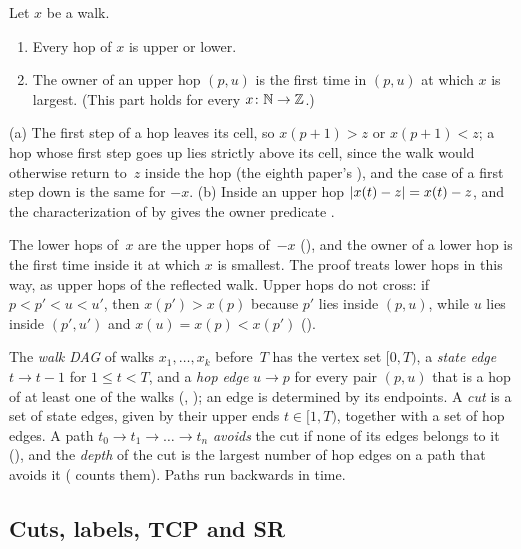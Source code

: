 \begin{lemma}\label{lem:hops}
Let $x$ be a walk.
\begin{enumerate}[label=(\alph*)]
\item Every hop of $x$ is upper or lower.
\item The owner of an upper hop $(p,u)$ is the first time in $(p,u)$ at which $x$ is largest. (This part holds for every
$x\colon\mathbb{N}\to\mathbb{Z}$.)
\end{enumerate}
\end{lemma}

\begin{outline}
(a) The first step of a hop leaves its cell, so $x(p+1)>z$ or $x(p+1)<z$; a hop whose first step goes up lies strictly above
its cell, since the walk would otherwise return to~$z$ inside the hop (the eighth paper's ),
and the case of a first step down is the same for $-x$. (b) Inside an upper hop $\lvert x(t)-z \rvert=x(t)-z$, and the
characterization of  by  gives the owner predicate
.
\end{outline}

The lower hops of~$x$ are the upper hops of~$-x$ (), and the owner of a lower hop is the
first time inside it at which $x$ is smallest. The proof treats lower hops in this way, as upper hops of the reflected walk.
Upper hops do not cross: if $p<p'<u<u'$, then $x(p')>x(p)$ because $p'$ lies inside $(p,u)$, while $u$ lies inside $(p',u')$
and $x(u)=x(p)<x(p')$ ().

The \emph{walk DAG} of walks $x_1,\dots,x_k$ before~$T$ has the vertex set $[0,T)$, a \emph{state edge} $t\to t-1$ for
$1\le t<T$, and a \emph{hop edge} $u\to p$ for every pair $(p,u)$ that is a hop of at least one of the walks
(, ); an edge is determined by its endpoints. A \emph{cut} is a set
of state edges, given by their upper ends $t\in[1,T)$, together with a set of hop edges. A path
$t_0\to t_1\to\dots\to t_n$ \emph{avoids} the cut if none of its edges belongs to it (), and
the \emph{depth} of the cut is the largest number of hop edges on a path that avoids it ( counts
them). Paths run backwards in time.

\subsection{Cuts, labels, TCP and SR}\label{sec:prelim-tcp}

